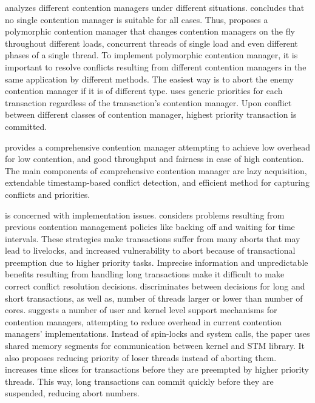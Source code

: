 \cite{springerlink:10.1007_11561927_23} analyzes different contention
managers under different situations. \cite{springerlink:10.1007_11561927_23}
concludes that no single contention manager is suitable for all cases.
Thus, \cite{springerlink:10.1007_11561927_23} proposes a polymorphic
contention manager that changes contention managers on the fly throughout
different loads, concurrent threads of single load and even different
phases of a single thread. To implement polymorphic contention manager,
it is important to resolve conflicts resulting from different contention
managers in the same application by different methods. The easiest
way is to abort the enemy contention manager if it is of different
type. \cite{springerlink:10.1007_11561927_23} uses generic priorities
for each transaction regardless of the transaction's contention manager.
Upon conflict between different classes of contention manager, highest
priority transaction is committed.

\cite{Spear:2009:CSC:1504176.1504199} provides a comprehensive contention
manager attempting to achieve low overhead for low contention, and
good throughput and fairness in case of high contention. The main
components of comprehensive contention manager are lazy acquisition,
extendable timestamp-based conflict detection, and efficient method
for capturing conflicts and priorities. 

\cite{Maldonado:2010:SST:1693453.1693465} is concerned with implementation
issues. \cite{Maldonado:2010:SST:1693453.1693465} considers problems
resulting from previous contention management policies like backing
off and waiting for time intervals. These strategies make transactions
suffer from many aborts that may lead to livelocks, and increased
vulnerability to abort because of transactional preemption due to
higher priority tasks. Imprecise information and unpredictable benefits
resulting from handling long transactions make it difficult to make
correct conflict resolution decisions. \cite{Maldonado:2010:SST:1693453.1693465}
discriminates between decisions for long and short transactions, as
well as, number of threads larger or lower than number of cores. \cite{Maldonado:2010:SST:1693453.1693465}
suggests a number of user and kernel level support mechanisms for
contention managers, attempting to reduce overhead in current contention
managers' implementations. Instead of spin-locks and system calls,
the paper uses shared memory segments for communication between kernel
and STM library. It also proposes reducing priority of loser threads
instead of aborting them. \cite{Maldonado:2010:SST:1693453.1693465}
increases time slices for transactions before they are preempted by
higher priority threads. This way, long transactions can commit quickly
before they are suspended, reducing abort numbers.

